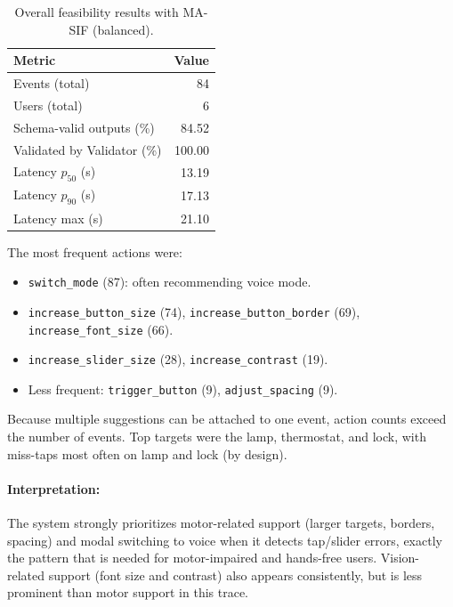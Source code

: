 \documentclass[openany]{book}
\begin{document}
\begin{table}[htb]
  \centering
  \caption{Overall feasibility results with MA-SIF (balanced).}
  \label{tab:overall-feasibility}
  \begin{tabular}{lr}
    \toprule
    \textbf{Metric} & \textbf{Value} \\
    \midrule
    Events (total) & 84 \\
    Users (total) & 6 \\
    Schema-valid outputs (\%) & 84.52 \\
    Validated by Validator (\%) & 100.00 \\
    Latency $p_{50}$ (s) & 13.19 \\
    Latency $p_{90}$ (s) & 17.13 \\
    Latency max (s) & 21.10 \\
    \bottomrule
  \end{tabular}
  \label{tab:overall-feasibility}
\end{table}

The most frequent actions were:
\begin{itemize}
    \item \texttt{switch\_mode} (87): often recommending voice mode.
    \item \texttt{increase\_button\_size} (74), \texttt{increase\_button\_border} (69), \texttt{increase\_font\_size} (66).
    \item \texttt{increase\_slider\_size} (28), \texttt{increase\_contrast} (19).
    \item Less frequent: \texttt{trigger\_button} (9), \texttt{adjust\_spacing} (9).
\end{itemize}
Because multiple suggestions can be attached to one event, action counts exceed the number of events. Top targets were the lamp, thermostat, and lock, with miss-taps most often on lamp and lock (by design).

\paragraph{Interpretation:} The system strongly prioritizes motor-related support (larger targets, borders, spacing) and modal switching to voice when it detects tap/slider errors, exactly the pattern that is needed for motor-impaired and hands-free users. Vision-related support (font size and contrast) also appears consistently, but is less prominent than motor support in this trace.
\end{document}
